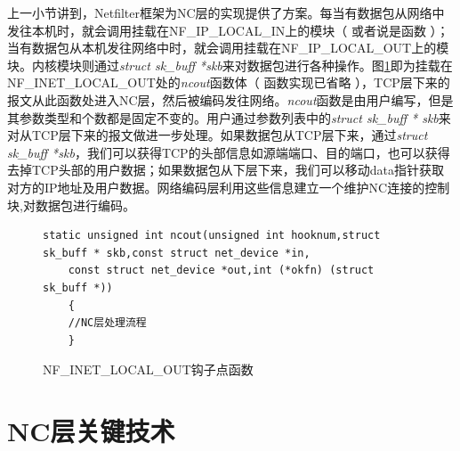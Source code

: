 \par

上一小节讲到，Netfilter框架为NC层的实现提供了方案。每当有数据包从网络中发往本机时，就会调用挂载在NF\_IP\_LOCAL\_IN上的模块（ 或者说是函数 ）；当有数据包从本机发往网络中时，就会调用挂载在NF\_IP\_LOCAL\_OUT上的模块。内核模块则通过\emph{struct sk\_buff *skb}来对数据包进行各种操作。图\ref{NCOUT}即为挂载在NF\_INET\_LOCAL\_OUT处的\emph{ncout}函数体（ 函数实现已省略 ），TCP层下来的报文从此函数处进入NC层，然后被编码发往网络。\emph{ncout}函数是由用户编写，但是其参数类型和个数都是固定不变的。用户通过参数列表中的\emph{struct sk\_buff * skb}来对从TCP层下来的报文做进一步处理。如果数据包从TCP层下来，通过\emph{struct sk\_buff *skb}，我们可以获得TCP的头部信息如源端端口、目的端口，也可以获得去掉TCP头部的用户数据；如果数据包从下层下来，我们可以移动data指针获取对方的IP地址及用户数据。网络编码层利用这些信息建立一个维护NC连接的控制块,对数据包进行编码。
\begin{figure}
	\begin{lstlisting}[language={[ANSI]C}]
	static unsigned int ncout(unsigned int hooknum,struct sk_buff * skb,const struct net_device *in,
	const struct net_device *out,int (*okfn) (struct sk_buff *))
	{
	//NC层处理流程	
	} 
	\end{lstlisting}
	\caption{NF\_INET\_LOCAL\_OUT钩子点函数}
	\label{NCOUT}
\end{figure}

\section{NC层关键技术}
